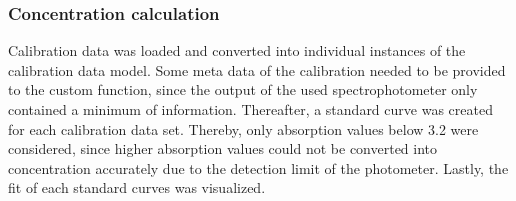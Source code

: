 \documentclass[letterpaper,12pt,english]{jupyterBook}
\begin{document}
\subsubsection{Concentration calculation}
\label{\detokenize{scenarios/SLAC_kinetic_characterization:concentration-calculation}}
\sphinxAtStartPar
Calibration data was loaded and converted into individual instances of the calibration data model. Some meta data of the calibration needed to be provided to the custom  function, since the output of the used spectrophotometer only contained a minimum of information. Thereafter, a standard curve was created for each calibration data set. Thereby, only absorption values below 3.2 were considered, since higher absorption values could not be converted into concentration accurately due to the detection limit of the photometer.
Lastly, the fit of each standard curves was visualized.
\end{document}
